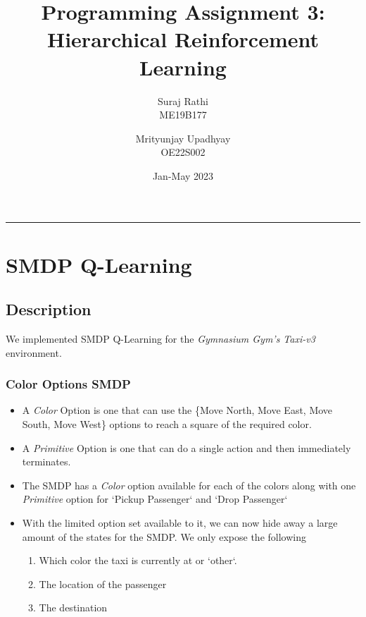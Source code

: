 \documentclass[A4]{article}
\title{Programming Assignment 3: Hierarchical Reinforcement Learning}
\date{Jan-May 2023}
\author{Suraj Rathi\\ ME19B177
\and Mrityunjay Upadhyay \\ OE22S002}
\begin{document}
    \maketitle
    \hrule


    \section{SMDP Q-Learning}

    \subsection{Description}

    \noindent We implemented SMDP Q-Learning for the \emph{Gymnasium Gym’s Taxi-v3} environment.

    \subsubsection{Color Options SMDP}
    \begin{itemize}
        \item A \emph{Color} Option is one that can use the \{Move North, Move East, Move South, Move West\} options to reach a square of the required color.
        \item A \emph{Primitive} Option is one that can do a single action and then immediately terminates.
        \item The SMDP has a \emph{Color} option available for each of the colors along with one \emph{Primitive} option for `Pickup Passenger` and `Drop Passenger`
        \item With the limited option set available to it, we can now hide away a large amount of the states for the SMDP. We only expose the following
        \begin{enumerate}
            \item Which color the taxi is currently at or `other`.
            \item The location of the passenger
            \item The destination
        \end{enumerate}
    \end{itemize}
\end{document}
